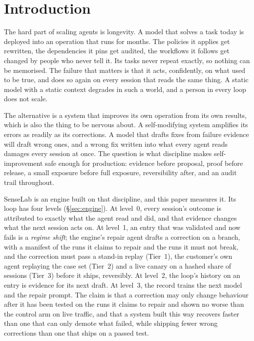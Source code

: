 \documentclass[11pt]{article}
\begin{document}
\section{Introduction}

The hard part of scaling agents is longevity. A model that solves a task today is deployed into
an operation that runs for months. The policies it applies get rewritten, the dependencies it
pins get audited, the workflows it follows get changed by people who never tell it. Its tasks
never repeat exactly, so nothing can be memorised. The failure that matters is that it acts,
confidently, on what used to be true, and does so again on every session that reads the same
thing. A static model with a static context degrades in such a world, and a person in every
loop does not scale.

The alternative is a system that improves its own operation from its own results, which is
also the thing to be nervous about. A self-modifying system amplifies its errors as readily as
its corrections. A model that drafts fixes from failure evidence will draft wrong ones, and a
wrong fix written into what every agent reads damages every session at once. The question is
what discipline makes self-improvement safe enough for production: evidence before proposal,
proof before release, a small exposure before full exposure, reversibility after, and an audit
trail throughout.

SenseLab is an engine built on that discipline, and this paper measures it. Its loop has four
levels (\S\ref{sec:engine}). At level~0, every session's outcome is attributed to exactly what
the agent read and did, and that evidence changes what the next session acts on. At level~1, an
entry that was validated and now fails is a \emph{regime shift}; the engine's repair agent drafts a
correction on a branch, with a manifest of the runs it claims to repair and the runs it must not
break, and the correction must pass a stand-in replay (Tier~1), the customer's own agent
replaying the case set (Tier~2) and a live canary on a hashed share of sessions (Tier~3) before
it ships, reversibly. At level~2, the loop's history on an entry is evidence for its next draft.
At level~3, the record trains the next model and the repair prompt. The claim is that a
correction may only change behaviour after it has been tested on the runs it claims to repair
and shown no worse than the control arm on live traffic, and that a system built this way
recovers faster than one that can only demote what failed, while shipping fewer wrong
corrections than one that ships on a passed test.
\end{document}
